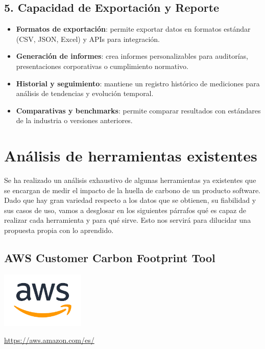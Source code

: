 \documentclass[12pt,a4paper]{report}
\begin{document}
\subsection*{5. Capacidad de Exportación y Reporte}
\begin{itemize}
  \item \textbf{Formatos de exportación}: permite exportar datos en formatos estándar (CSV, JSON, Excel) y APIs para integración.
  \item \textbf{Generación de informes}: crea informes personalizables para auditorías, presentaciones corporativas o cumplimiento normativo.
  \item \textbf{Historial y seguimiento}: mantiene un registro histórico de mediciones para análisis de tendencias y evolución temporal.
  \item \textbf{Comparativas y benchmarks}: permite comparar resultados con estándares de la industria o versiones anteriores.
\end{itemize}

\section{Análisis de herramientas existentes}

Se ha realizado un análisis exhaustivo de algunas herramientas ya existentes
que se encargan de medir el impacto de la huella de carbono de un producto
software. Dado que hay gran variedad respecto a los datos que se obtienen, su
fiabilidad y sus casos de uso, vamos a desglosar en los siguientes párrafos qué
es capaz de realizar cada herramienta y para qué sirve. Esto nos servirá para
dilucidar una propuesta propia con lo aprendido.

\subsection*{AWS Customer Carbon Footprint Tool}

\begin{center}
\includegraphics[width=0.3\textwidth]{imagenes/AWS_Logo.png}
\end{center}

\href{https://aws.amazon.com/es/}{https://aws.amazon.com/es/}
\end{document}
